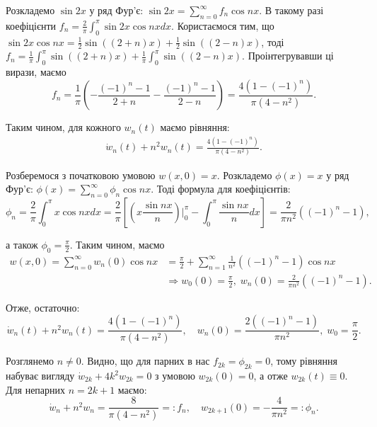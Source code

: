 \documentclass{test_template}
\begin{document}
Розкладемо $\sin 2x$ у ряд Фур'є: $\sin 2x = \sum_{n=0}^{\infty} f_n \cos nx$. В
такому разі коефіцієнти $f_n = \frac{2}{\pi}\int_0^{\pi} \sin 2x \cos nx dx$.
Користаємося тим, що $\sin 2x\cos nx = \frac{1}{2}\sin ((2+n)x) +
\frac{1}{2}\sin ((2-n)x)$, тоді $f_n = \frac{1}{\pi}\int_0^{\pi} \sin((2+n)x) +
\frac{1}{\pi}\int_0^{\pi} \sin((2-n)x)$. Проінтегрувавши ці вирази, маємо
\begin{equation*}
    f_n = \frac{1}{\pi}\left(-\frac{(-1)^n-1}{2+n} - \frac{(-1)^n - 1}{2-n}\right) = \frac{4(1-(-1)^n)}{\pi(4-n^2)}.
\end{equation*}

Таким чином, для кожного $w_n(t)$ маємо рівняння:
\begin{gather*}
    \dot{w}_n(t) + n^2 w_n(t) = \frac{4(1-(-1)^n)}{\pi(4-n^2)}.
\end{gather*}

Розберемося з початковою умовою $w(x,0)=x$. Розкладемо $\phi(x) = x$ у ряд
Фур'є: $\phi(x) = \sum_{n=0}^{\infty}\phi_n \cos nx$. Тоді формула для коефіцієнтів:
\begin{equation*}
    \phi_n = \frac{2}{\pi}\int_0^{\pi} x \cos nx dx = \frac{2}{\pi}\left[\left(x \frac{\sin nx}{n}\right)\Big|_{0}^{\pi} - \int_0^{\pi} \frac{\sin nx}{n}dx\right] = \frac{2}{\pi n^2}((-1)^n-1),
\end{equation*}

а також $\phi_0 = \frac{\pi}{2}$. Таким чином, маємо
\begin{align*}
    w(x,0)=\sum_{n=0}^{\infty}w_n(0)\cos nx &= \frac{\pi}{2} + \sum_{n=1}^{\infty} \frac{1}{n^2}((-1)^n-1) \cos nx \\
    &\Rightarrow w_0(0) = \frac{\pi}{2}, \; w_n(0) = \frac{2}{\pi n^2}((-1)^n-1).
\end{align*}

Отже, остаточно:
\begin{equation*}
    \dot{w}_n(t) + n^2 w_n(t) = \frac{4(1-(-1)^n)}{\pi(4-n^2)}, \quad w_n(0) = \frac{2((-1)^n-1)}{\pi n^2}, \; w_0 = \frac{\pi}{2}.
\end{equation*}

Розглянемо $n \neq 0$. Видно, що для парних в нас $f_{2k} = \phi_{2k} = 0$, тому 
рівняння набуває вигляду $\dot{w}_{2k} + 4k^2 w_{2k} = 0$ з умовою $w_{2k}(0)=0$,
а отже $w_{2k}(t) \equiv 0$. Для непарних $n=2k+1$ маємо:
\begin{equation*}
    \dot{w}_{n} + n^2w_{n} = \frac{8}{\pi(4-n^2)} =: f_n, \quad w_{2k+1}(0) = -\frac{4}{\pi n^2} =: \phi_n.
\end{equation*}
\end{document}
